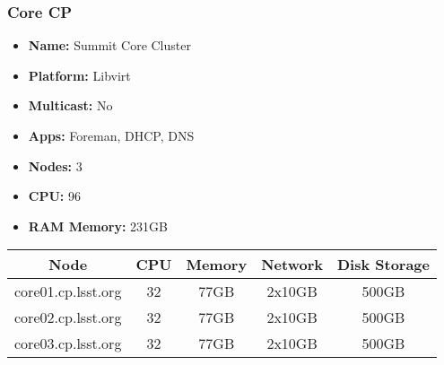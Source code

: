 \subsubsection{Core CP}
\begin{itemize}
  \itemsep0em 
  \item \textbf{Name:}       Summit Core Cluster
  \item \textbf{Platform:}   Libvirt
  \item \textbf{Multicast:}  No
  \item \textbf{Apps:}       Foreman, DHCP, DNS
  \item \textbf{Nodes:}      3
  \item \textbf{CPU:}        96
  \item \textbf{RAM Memory:} 231GB
\end{itemize}
\begin{center}
  \small
  \begin{tabular}{||c c c c c||}
    \hline
    \textbf{Node} & \textbf{CPU} & \textbf{Memory} & \textbf{Network} & \textbf{Disk Storage} \\ [0.5ex]
    \hline
    core01.cp.lsst.org & 32 & 77GB & 2x10GB & 500GB \\
    \hline
    core02.cp.lsst.org & 32 & 77GB & 2x10GB & 500GB \\
    \hline
    core03.cp.lsst.org & 32 & 77GB & 2x10GB & 500GB \\
    \hline
  \end{tabular}
\end{center}


